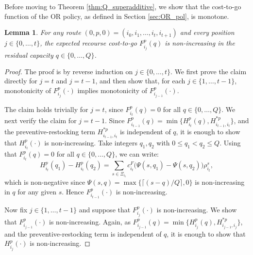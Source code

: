 \documentclass{article}
\newtheorem{lemma}{Lemma}
\newcommand{\rev}[1]{{\color{black}#1}}
\begin{document}
Before moving to Theorem \ref{thm:Q_superadditive}, we show that the cost-to-go function of the OR policy, \rev{as defined in Section \ref{sec:OR_pol}}, is monotone. 
\begin{lemma}
\label{lemma:monotonicity_cost_to_go}
For any \rev{route $(0, p, 0) = (i_0, i_{1}, \dots, i_{t}, i_{t+1})$ and every position $j \in \{0,\dots,t\}$}, the expected recourse cost-to-go $F^{p}_{i_{j}}(q)$ is non-increasing in the residual capacity \rev{$q \in \{0,\dots,Q\}$}.
\end{lemma}
\begin{proof}
\rev{The proof is by reverse induction on $j\in\{0,\dots,t\}$. We first prove the claim directly for $j=t$ and $j=t-1$, and then show that, for each $j\in\{1,\dots,t-1\}$, monotonicity of $F^p_{i_j}(\cdot)$ implies monotonicity of
$F^p_{i_{j-1}}(\cdot)$.

The claim holds trivially for
$j=t$, since $F^p_{i_t}(q)=0$ for all $q \in \{0,\dots,Q\}$. We next verify the claim for
$j=t-1$. Since $F^p_{i_{t-1}}(q)
=
\min\{H^p_{i_t}(q),H^{*p}_{i_{t-1},i_t}\}$,
and the preventive-restocking term $H^{*p}_{i_{t-1},i_t}$ is independent of $q$, it is enough to
show that $H^p_{i_t}(\cdot)$ is non-increasing. Take integers $q_1,q_2$ with $0\le q_1<q_2\le Q$. Using that $F^p_{i_t}(q)=0$ for all $q \in \{0,\dots,Q\}$, we can write:
\[
H^p_{i_t}(q_1)-H^p_{i_t}(q_2)
=
\sum_{s\in\Xi_{i_t}}
c^F_{i_t}\bigl(\Psi(s,q_1)-\Psi(s,q_2)\bigr)\rho_{i_t}^s,
\]
which is non-negative since $\Psi(s,q)=\max\{\lceil(s - q)/Q\rceil,0\}$ is non-increasing in $q$ for any given $s$. Hence
$F^p_{i_{t-1}}(\cdot)$ is non-increasing. 

Now fix $j\in\{1,\dots,t-1\}$ and suppose that $F^p_{i_j}(\cdot)$ is non-increasing. We show that $F^p_{i_{j-1}}(\cdot)$ is non-increasing. Again, as $F^p_{i_{j-1}}(q) = \min\{H^p_{i_j}(q),H^{*p}_{i_{j-1},i_j}\}$,
and the preventive-restocking term is independent of $q$, it is enough to show that $H^p_{i_j}(\cdot)$ is non-increasing.

}
\end{proof}
\end{document}

